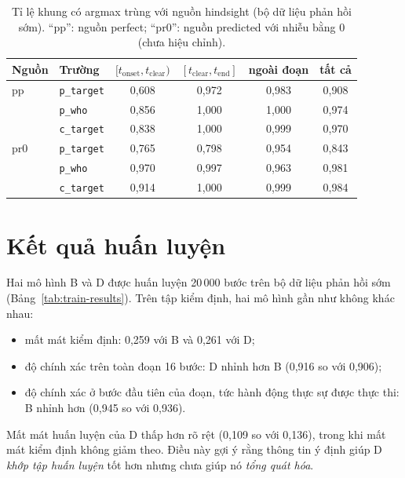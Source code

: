 \begin{table}[htbp]
  \centering
  \caption{Tỉ lệ khung có argmax trùng với nguồn hindsight (bộ dữ liệu phản hồi sớm). ``pp'': nguồn perfect; ``pr0'': nguồn predicted với nhiễu bằng 0 (chưa hiệu chỉnh).}
  \label{tab:source-agreement}
  \begin{tabular}{@{}llcccc@{}}
    \toprule
    \textbf{Nguồn} & \textbf{Trường} & $[t_\text{onset}, t_\text{clear})$ & $[t_\text{clear}, t_\text{end}]$ & \textbf{ngoài đoạn} & \textbf{tất cả} \\
    \midrule
    pp  & \texttt{p\_target} & 0,608 & 0,972 & 0,983 & 0,908 \\
        & \texttt{p\_who}    & 0,856 & 1,000 & 1,000 & 0,974 \\
        & \texttt{c\_target} & 0,838 & 1,000 & 0,999 & 0,970 \\
    \addlinespace
    pr0 & \texttt{p\_target} & 0,765 & 0,798 & 0,954 & 0,843 \\
        & \texttt{p\_who}    & 0,970 & 0,997 & 0,963 & 0,981 \\
        & \texttt{c\_target} & 0,914 & 1,000 & 0,999 & 0,984 \\
    \bottomrule
  \end{tabular}
\end{table}

\section{Kết quả huấn luyện}
\label{sec:training-results}

Hai mô hình B và D được huấn luyện 20\,000 bước trên bộ dữ liệu phản hồi sớm (Bảng~\ref{tab:train-results}). Trên tập kiểm định, hai mô hình gần như không khác nhau:
\begin{itemize}
  \item mất mát kiểm định: 0,259 với B và 0,261 với D;
  \item độ chính xác trên toàn đoạn 16 bước: D nhỉnh hơn B (0,916 so với 0,906);
  \item độ chính xác ở bước đầu tiên của đoạn, tức hành động thực sự được thực thi: B nhỉnh hơn (0,945 so với 0,936).
\end{itemize}
Mất mát huấn luyện của D thấp hơn rõ rệt (0,109 so với 0,136), trong khi mất mát kiểm định không giảm theo. Điều này gợi ý rằng thông tin ý định giúp D \emph{khớp tập huấn luyện} tốt hơn nhưng chưa giúp nó \emph{tổng quát hóa}.

